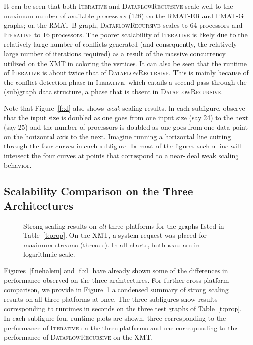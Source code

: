 \documentclass{article}
\begin{document}
It can be seen that both \textsc{Iterative} and \textsc{DataflowRecursive} 
scale well to the maximum number of available processors (128) 
on the RMAT-ER and RMAT-G graphs; on the RMAT-B graph,
\textsc{DataflowRecursive} scales to 64 processors and  \textsc{Iterative} 
to 16 processors.
The poorer scalability of \textsc{Iterative} is likely due to the relatively large number of conflicts 
generated (and consequently, the relatively large number of iterations required) 
as a result of the massive concurrency utilized on the XMT in coloring the vertices.
It can also be seen that the runtime of \textsc{Iterative} is about twice that of \textsc{DataflowRecursive}.
This is mainly because of the conflict-detection phase in \textsc{Iterative}, 
which entails a second pass through the (sub)graph data structure, 
a phase that is absent in \textsc{DataflowRecursive}.

Note that Figure~\ref{f:xl} also shows {\em weak} scaling results. 
In each subfigure, observe that the input size is doubled as one goes 
from one input size (say 24) to the next (say 25) and the number of processors 
is doubled as one goes from one data point on the horizontal axis to the next.
Imagine running a horizontal line cutting through the four curves in each subfigure. 
In most of the figures such a line will intersect the four curves at points that correspond  
to a near-ideal weak scaling behavior.

 
\subsection{Scalability Comparison on the Three Architectures}
\label{sec:scalability-comp}

\begin{figure}
\centering
{}
\caption{\small Strong scaling results on {\em all}  three platforms for the graphs listed in 
Table~\ref{t:prop}.
On the XMT, a system request was placed for maximum  streams (threads).
In all charts, both axes are in logarithmic scale.}
\label{f:all}
\end{figure}

Figures~\ref{f:nehalem} and \ref{f:xl} have already shown some
of the differences in performance observed on the three architectures.
For further cross-platform comparison, we provide in
Figure~\ref{f:all} a condensed summary of strong scaling results on all three platforms at once. 
The three subfigures show results corresponding to runtimes in seconds on
the three test graphs of Table~\ref{t:prop}.
In each subfigure four runtime plots are shown, 
three corresponding to the performance of \textsc{Iterative} on the
three platforms and one corresponding to the performance of 
\textsc{DataflowRecursive} on the XMT.
\end{document}
